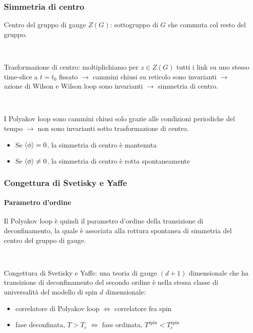 \documentclass{beamer}
\begin{document}
\begin{frame}
	\frametitle{Simmetria di centro}

	\alert{Centro del gruppo di gauge} $Z(G)$: sottogruppo di $G$ che commuta col resto del gruppo.

	\

	\alert{Trasformazione di centro}: moltiplichiamo per $z \in Z(G)$ tutti i link su uno stesso time-slice a $t = t_0$ fissato
	$\rightarrow$ cammini chiusi su reticolo sono invarianti $\rightarrow$ azione di Wilson e Wilson loop
	sono invarianti $\rightarrow$ \alert{simmetria di centro}.
	
	\

	I Polyakov loop sono cammini chiusi solo grazie alle condizioni periodiche del tempo $\rightarrow$ \alert{non sono
	invarianti sotto trasformazione di centro}. 

	\begin{itemize}
		\item Se $\expval{\phi} = 0$, la simmetria di centro è mantenuta
		\item Se $\expval{\phi} \ne 0$, la simmetria di centro è rotta spontaneamente
	\end{itemize}

\end{frame}

\begin{frame}
	\frametitle{Congettura di Svetisky e Yaffe}
	\framesubtitle{Parametro d'ordine}

	Il Polyakov loop è quindi il \alert{parametro d'ordine} della transizione di deconfinamento, la quale è 
	associata alla rottura spontanea di simmetria del centro del gruppo di gauge.

	\

	\alert{Congettura di Svetisky e Yaffe}: una teoria di gauge $(d+1)$ dimensionale che ha transizione di deconfinamento del 
	\alert{secondo ordine} è nella stessa classe di universalità del modello di spin $d$ dimensionale:

	\begin{itemize}
		\item correlatore di Polyakov loop $\iff$ correlatore fra spin 
		\item fase deconfinata, $T > T_c$ $\iff$ fase ordinata, $T^{\text{spin}} < T_c^{\text{spin}}$
	\end{itemize}

\end{frame}
\end{document}
